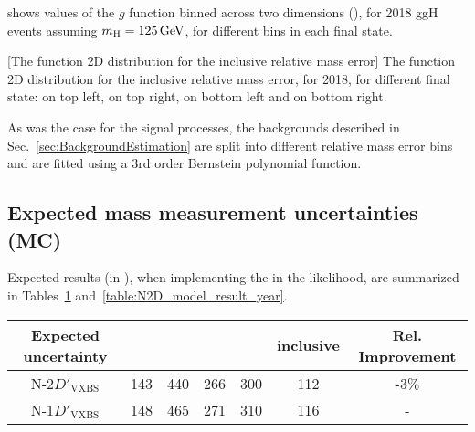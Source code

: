  shows values of the $g$ function binned across two dimensions (\Dkinbkg \vs \relmfourlerrflat), for 2018 ggH events assuming $m_{\mathrm{H}} = 125\,\text{Ge\hspace{-.08em}V}$,
for different bins in each final state.
\begin{multiFigure}
	\centering
		[The function 2D distribution for the inclusive relative mass error]
		{The function 2D distribution for the inclusive relative mass error, for 2018, for different final state:
		\fourmu on top left, \foure on top right, \twoetwomu on bottom left and \twomutwoe on bottom right.}
	\label{2D_distribution}
\end{multiFigure}

As was the case for the signal processes, the backgrounds described in Sec.~\ref{sec:BackgroundEstimation} are split into different relative mass error bins and are fitted using a 3rd order Bernstein polynomial function.

\subsection{Expected mass measurement uncertainties (MC)}
Expected results (in \MeV), when implementing the \Dkinbkg in the likelihood, 
are summarized in Tables~\ref{table:N2D_model_result} and~\ref{table:N2D_model_result_year}.
\begin{table}[ht]	
\begin{center}
	\begin{tabular}{ccccccc}
	\hline			
	Expected uncertainty	&	\fourmu	&	\foure	&	\twoetwomu	&\twomutwoe	& inclusive	&	 Rel. Improvement \\
	\hline			
	N-2$D'_\text{VXBS}$	&	143	&	440	&	266	&	300	&	112	&	-3\%	\\
	N-1$D'_\text{VXBS}$	&	148	&	465	&	271	&	310	&	116	&	-	\\
	\hline
	\end{tabular}
	\label{table:N2D_model_result} 
\end{center}
\end{table}

